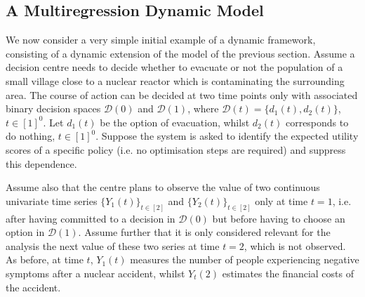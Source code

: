 \label{perfigura}
\subsection{A Multiregression Dynamic Model}
We now consider a very simple initial example of a dynamic framework, consisting of a dynamic extension of the model of the previous section. Assume a decision centre needs to decide whether to evacuate or not the population of a small village close to a nuclear reactor which is contaminating the surrounding area.  The course of action can be decided at two time points only with associated binary decision spaces $\mathcal{D}(0)$ and $\mathcal{D}(1)$, where $\mathcal{D}(t)=\{d_1(t),d_2(t)\}$, $t\in[1]^0$. Let $d_1(t)$ be the option of evacuation, whilst $d_2 (t)$ corresponds to do nothing, $t\in[1]^0$.  Suppose the system is asked to identify the expected utility scores of a specific policy (i.e. no optimisation steps are required) and suppress this dependence.

 Assume also that the centre plans to observe the value of two continuous univariate time series $\{Y_1 (t)\}_{t\in[2]}$  and $\{Y_2(t)\}_{t\in[2]}$ only at time $t=1$, i.e. after having committed to a decision in $\mathcal{D}(0)$ but before having to choose an option in $\mathcal{D}(1)$. Assume further that it is only considered relevant for the analysis the next value of these two series at time $t=2$, which is not observed.  As before, at time $t$,  $Y_1(t)$ measures the number of people experiencing negative symptoms after a nuclear accident, whilst $Y_t(2)$  estimates the financial costs of the accident.
      
